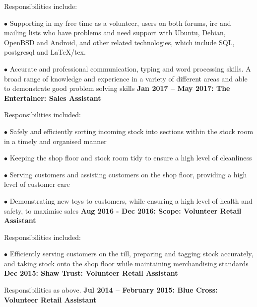 \documentclass[10pt,a4paper]{book}
\begin{document}
\begin{flushleft}
Responsibilities include:

  \item[$\bullet$]Supporting in my free time as a volunteer, users on both forums, irc and mailing lists who have problems and need support with Ubuntu, Debian, OpenBSD and Android, and other related technologies, which include SQL, postgresql and LaTeX/tex. 
  \item[$\bullet$] Accurate and professional communication, typing and word processing skills. A broad range of knowledge and experience in a variety of different areas and able to demonstrate good problem solving skills
    \linebreak{}
    \linebreak{}
\textbf {Jan 2017 -- May 2017: The Entertainer: Sales Assistant}
  
Responsibilities included:

  \item[$\bullet$]Safely and efficiently sorting incoming stock into sections within the stock room in a timely and organised manner

  \item[$\bullet$]Keeping the shop floor and stock room tidy to ensure a high level of cleanliness

  \item[$\bullet$]Serving customers and assisting customers on the shop floor, providing a high level of customer care

  \item[$\bullet$]Demonstrating new toys to customers, while ensuring a high level of health and safety, to maximise sales
    \linebreak{}
    \linebreak{}
  \textbf {Aug 2016 - Dec 2016: Scope: Volunteer Retail Assistant}

Responsibilities included:

  \item[$\bullet$]Efficiently serving customers on the till, preparing and tagging stock accurately, and taking stock onto the shop floor while maintaining merchandising standards
    \linebreak{}
    \linebreak{}
  \textbf {Dec 2015: Shaw Trust: Volunteer Retail Assistant}

Responsibilities as above.
\linebreak{}
\linebreak{}
  \textbf {Jul 2014 -- February 2015: Blue Cross: Volunteer Retail Assistant}


\end{flushleft}
\end{document}
